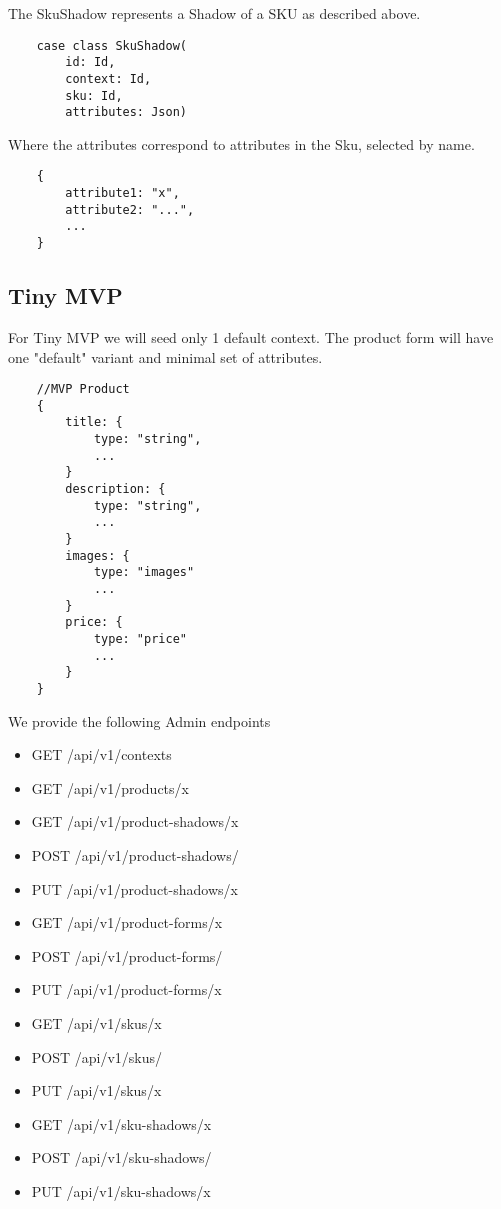 \documentclass[11pt]{article}
\begin{document}
The SkuShadow represents a Shadow of a SKU as described above. 

\begin{lstlisting}
    case class SkuShadow(
        id: Id,
        context: Id,
        sku: Id,
        attributes: Json)
\end{lstlisting}

Where the attributes correspond to attributes in the Sku, selected by
name.

\begin{lstlisting}
    {
        attribute1: "x",
        attribute2: "...",
        ...
    }
\end{lstlisting}

\newpage
\subsection{Tiny MVP}

For Tiny MVP we will seed only 1 default context. The product form will have one
"default" variant and minimal set of attributes.

\begin{lstlisting}
    //MVP Product 
    {
        title: { 
            type: "string",
            ...
        }
        description: { 
            type: "string",
            ...  
        }
        images: { 
            type: "images"
            ...  
        }
        price: {
            type: "price"
            ...
        }
    }
\end{lstlisting}
\newpage

We provide the following Admin endpoints

\begin{itemize}
    \item GET /api/v1/contexts
    \item GET /api/v1/products/x
    \item GET /api/v1/product-shadows/x
    \item POST /api/v1/product-shadows/
    \item PUT /api/v1/product-shadows/x
    \item GET /api/v1/product-forms/x
    \item POST /api/v1/product-forms/
    \item PUT /api/v1/product-forms/x
    \item GET /api/v1/skus/x
    \item POST /api/v1/skus/
    \item PUT /api/v1/skus/x
    \item GET /api/v1/sku-shadows/x
    \item POST /api/v1/sku-shadows/
    \item PUT /api/v1/sku-shadows/x
\end{itemize}
\end{document}

